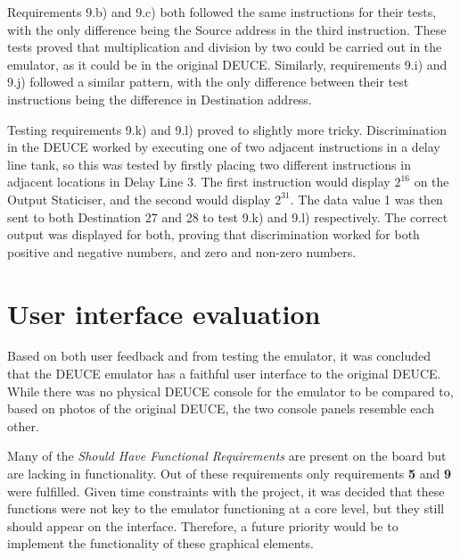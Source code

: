 \documentclass{l4proj}
\begin{document}
Requirements 9.b) and 9.c) both followed the same instructions for their tests, with the only difference being the Source address in the third instruction. These tests proved that multiplication and division by two could be carried out in the emulator, as it could be in the original DEUCE. Similarly, requirements 9.i) and 9.j) followed a similar pattern, with the only difference between their test instructions being the difference in Destination address.

Testing requirements 9.k) and 9.l) proved to slightly more tricky. Discrimination in the DEUCE worked by executing one of two adjacent instructions in a delay line tank, so this was tested by firstly placing two different instructions in adjacent locations in Delay Line 3. The first instruction would display $ 2^{16} $ on the Output Staticiser, and the second would display $ 2^{31} $. The data value 1 was then sent to both Destination 27 and 28 to test 9.k) and 9.l) respectively. The correct output was displayed for both, proving that discrimination worked for both positive and negative numbers, and zero and non-zero numbers.

\section{User interface evaluation}
Based on both user feedback and from testing the emulator, it was concluded that the DEUCE emulator has a faithful user interface to the original DEUCE. While there was no physical DEUCE console for the emulator to be compared to, based on photos of the original DEUCE, the two console panels resemble each other. 

Many of the \textit{Should Have Functional Requirements} are present on the board but are lacking in functionality. Out of these requirements only requirements \textbf{5} and \textbf{9} were fulfilled. Given time constraints with the project, it was decided that these functions were not key to the emulator functioning at a core level, but they still should appear on the interface. Therefore, a future priority would be to implement the functionality of these graphical elements.
\end{document}
